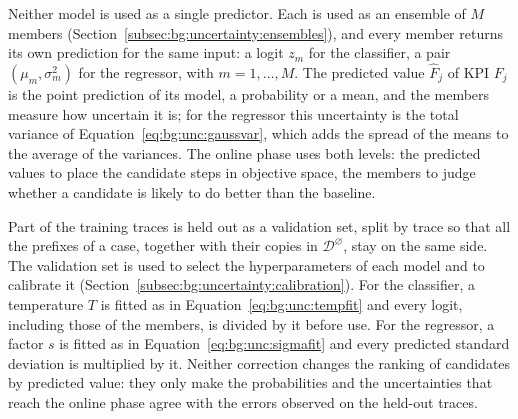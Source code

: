 Neither model is used as a single predictor. Each is used as an ensemble of
$M$ members (Section~\ref{subsec:bg:uncertainty:ensembles}), and every
member returns its own prediction for the same input: a logit $z_m$ for the
classifier, a pair $(\mu_m, \sigma_m^{2})$ for the regressor, with
$m = 1, \dots, M$. The predicted value $\hat{F}_j$ of KPI $F_j$ is the point
prediction of its model, a probability or a mean, and the members measure
how uncertain it is; for the regressor this uncertainty is the total
variance of Equation~\eqref{eq:bg:unc:gaussvar}, which adds the spread of
the means to the average of the variances. The online phase uses both
levels: the predicted values to place the candidate steps in objective
space, the members to judge whether a candidate is likely to do better than
the baseline.

Part of the training traces is held out as a validation set, split by trace
so that all the prefixes of a case, together with their copies in
$\mathcal{D}^{\varnothing}$, stay on the same side. The validation set is
used to select the hyperparameters of each model and to calibrate it
(Section~\ref{subsec:bg:uncertainty:calibration}). For the classifier, a
temperature $T$ is fitted as in Equation~\eqref{eq:bg:unc:tempfit} and every
logit, including those of the members, is divided by it before use. For the
regressor, a factor $s$ is fitted as in Equation~\eqref{eq:bg:unc:sigmafit}
and every predicted standard deviation is multiplied by it. Neither
correction changes the ranking of candidates by predicted value: they only
make the probabilities and the uncertainties that reach the online phase
agree with the errors observed on the held-out traces.



